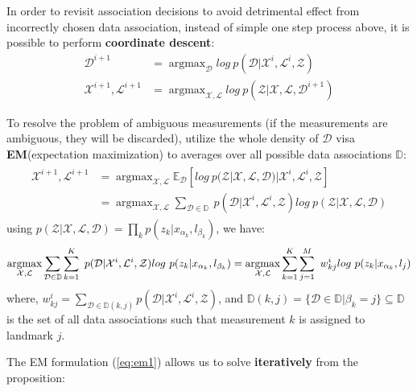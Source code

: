\documentclass[12pt]{article}
\DeclareMathOperator*{\argmax}{argmax} %
\numberwithin{equation}{section}
\begin{document}
In order to revisit association decisions to avoid detrimental effect from incorrectly chosen data association, instead of simple one step process above, it is possible to perform \textbf{coordinate descent}:
\begin{subequations}
\begin{align}
	\mathcal{D}^{i+1} &= \argmax_{\mathcal{D}} log\ p(\mathcal{D}|\mathcal{X}^i,\mathcal{L}^i,\mathcal{Z}) \\
	\mathcal{X}^{i+1}, \mathcal{L}^{i+1} &= \argmax_{\mathcal{X},\mathcal{L}} log\ p(\mathcal{Z}|\mathcal{X},\mathcal{L},\mathcal{D}^{i+1})
\end{align}
\end{subequations} \par
To resolve the problem of ambiguous measurements (if the measurements are ambiguous, they will be discarded), utilize the whole density of $\mathcal{D}$ visa \textbf{EM}(expectation maximization) to averages over all possible data associations $\mathbb{D}$:
\begin{align}\begin{split}\label{eq:em1}
	\mathcal{X}^{i+1}, \mathcal{L}^{i+1} &= 
	\argmax_{\mathcal{X},\mathcal{L}} \mathbb{E}_{\mathcal{D}} [log\ p(\mathcal{Z}|\mathcal{X},\mathcal{L},\mathcal{D})|\mathcal{X}^i,\mathcal{L}^i,\mathcal{Z}] \\
	&= \argmax_{\mathcal{X},\mathcal{L}} \sum_{\mathcal{D} \in \mathbb{D}} \ p(\mathcal{D}|\mathcal{X}^i,\mathcal{L}^i,\mathcal{Z}) log\ p(\mathcal{Z}|\mathcal{X},\mathcal{L},\mathcal{D})
\end{split}\end{align}
using $p(\mathcal{Z}|\mathcal{X},\mathcal{L},\mathcal{D})=\prod_kp(z_k|x_{\alpha_k}, l_{\beta_k})$, we have:
\begin{equation}\label{eq:em2}
	\argmax_{\mathcal{X},\mathcal{L}} \sum_{\mathcal{D} \in \mathbb{D}} \sum_{k=1}^K \ p(\mathcal{D}|\mathcal{X}^i,\mathcal{L}^i,\mathcal{Z})log\ p(z_k|x_{\alpha_k}, l_{\beta_k})  \\
	= \argmax_{\mathcal{X},\mathcal{L}} \sum_{k=1}^K \sum_{j=1}^{M} \ w^i_{kj} log\ p(z_k|x_{\alpha_k}, l_j) 
\end{equation}
where, $w^i_{kj}=\sum_{\mathcal{D} \in \mathbb{D}(k,j)} p(\mathcal{D}|\mathcal{X}^i,\mathcal{L}^i,\mathcal{Z})$, and $\mathbb{D}(k,j)=\{\mathcal{D} \in \mathbb{D} | \beta_k = j\} \subseteq \mathbb{D}$ is the set of all data associations such that measurement $k$ is assigned to landmark $j$. \par
The EM formulation (\ref{eq:em1}) allows us to solve \textbf{iteratively} from the proposition:
\end{document}
